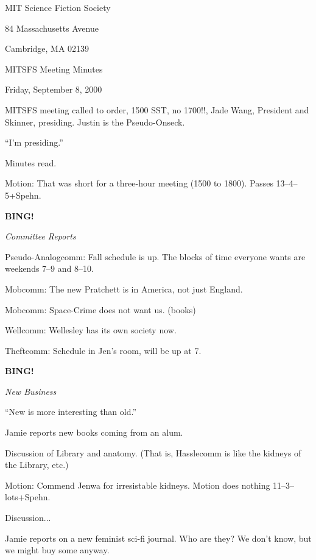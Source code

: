 \documentclass[12pt]{article}
\newcommand{\bing}{{\bf BING!} }
\newcommand{\goto}[1]{\bing \vskip 12pt \centerline{{\em{#1}}}}
\begin{document}
\begin{center}

MIT Science Fiction Society 

84 Massachusetts Avenue

Cambridge, MA 02139

\vspace{12pt}

MITSFS Meeting Minutes 

Friday, September 8, 2000

\end{center}
 
\vspace{18pt}

\setlength{\parskip}{6pt}

\noindent
MITSFS meeting called to order, 1500 SST, no 1700!!, Jade Wang, President
and Skinner, presiding.  Justin is the Pseudo-Onseck.


``I'm presiding.''

Minutes read.

Motion: That was short for a three-hour meeting (1500 to 1800).
Passes 13--4--5+Spehn.

\goto{Committee Reports}

Pseudo-Analogcomm: Fall schedule is up.  The blocks of time everyone
wants are weekends 7--9 and 8--10.

Mobcomm: The new Pratchett is in America, not just England.

Mobcomm: Space-Crime does not want us.  (books)

Wellcomm: Wellesley has its own society now.

Theftcomm: Schedule in Jen's room, will be up at 7.

\goto{New Business}

``New is more interesting than old.''

Jamie reports new books coming from an alum.

Discussion of Library and anatomy.  (That is, Hasslecomm is like the
kidneys of the Library, etc.)

Motion: Commend Jenwa for irresistable kidneys.  Motion does nothing
11--3--lots+Spehn.

Discussion...

Jamie reports on a new feminist sci-fi journal.  Who are they?  We
don't know, but we might buy some anyway.
\end{document}
